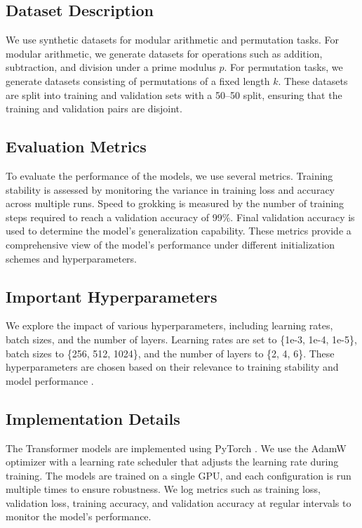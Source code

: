 \documentclass{article} %
\begin{document}
\subsection{Dataset Description}
We use synthetic datasets for modular arithmetic and permutation tasks. For modular arithmetic, we generate datasets for operations such as addition, subtraction, and division under a prime modulus \(p\). For permutation tasks, we generate datasets consisting of permutations of a fixed length \(k\). These datasets are split into training and validation sets with a 50--50 split, ensuring that the training and validation pairs are disjoint.

\subsection{Evaluation Metrics}
To evaluate the performance of the models, we use several metrics. Training stability is assessed by monitoring the variance in training loss and accuracy across multiple runs. Speed to grokking is measured by the number of training steps required to reach a validation accuracy of 99\%. Final validation accuracy is used to determine the model's generalization capability. These metrics provide a comprehensive view of the model's performance under different initialization schemes and hyperparameters.

\subsection{Important Hyperparameters}
We explore the impact of various hyperparameters, including learning rates, batch sizes, and the number of layers. Learning rates are set to \{1e-3, 1e-4, 1e-5\}, batch sizes to \{256, 512, 1024\}, and the number of layers to \{2, 4, 6\}. These hyperparameters are chosen based on their relevance to training stability and model performance \citep{kingma2014adam, loshchilov2017adamw}.

\subsection{Implementation Details}
The Transformer models are implemented using PyTorch \citep{paszke2019pytorch}. We use the AdamW optimizer \citep{loshchilov2017adamw} with a learning rate scheduler that adjusts the learning rate during training. The models are trained on a single GPU, and each configuration is run multiple times to ensure robustness. We log metrics such as training loss, validation loss, training accuracy, and validation accuracy at regular intervals to monitor the model's performance.
\end{document}
